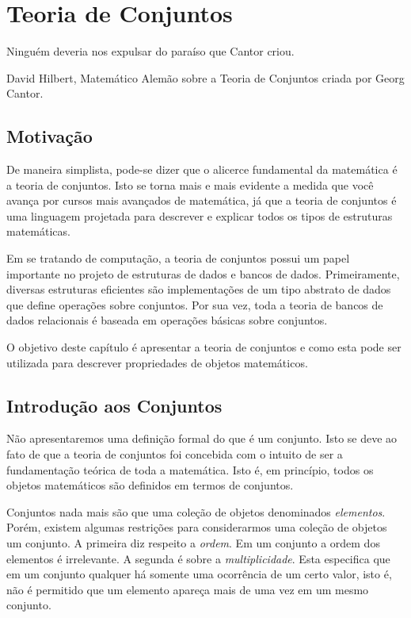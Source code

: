 \chapter{Teoria de Conjuntos}\label{cap5}

\epigraph{Ninguém deveria nos expulsar do paraíso que Cantor criou.}{David Hilbert, Matemático Alemão sobre a Teoria de
  Conjuntos criada por Georg Cantor.}

\section{Motivação}

De maneira simplista, pode-se dizer que o alicerce fundamental da
matemática é a teoria de conjuntos. Isto se torna mais e mais evidente
a medida que você avança por cursos mais avançados de matemática, já
que a teoria de conjuntos é uma linguagem projetada para descrever e
explicar todos os tipos de estruturas matemáticas.

Em se tratando de computação, a teoria de conjuntos possui um papel
importante no projeto de estruturas de dados e bancos de
dados. Primeiramente, diversas estruturas
eficientes são implementações de um tipo abstrato de dados que
define operações sobre conjuntos. Por sua vez, toda a teoria de bancos
de dados relacionais é baseada em operações básicas sobre conjuntos.

O objetivo deste capítulo é apresentar a teoria de conjuntos e como
esta pode ser utilizada para descrever propriedades de objetos
matemáticos.

\section{Introdução aos Conjuntos}

Não apresentaremos uma definição formal do que é um conjunto. Isto se
deve ao fato de que  a teoria de conjuntos foi concebida com o intuito
de ser a fundamentação teórica de toda a matemática. Isto é, em
princípio, todos os objetos matemáticos são definidos em termos de
conjuntos.

Conjuntos nada mais são que uma coleção de objetos denominados
\emph{elementos}. Porém, existem algumas restrições para considerarmos
uma coleção de objetos um conjunto. A primeira diz respeito a
\emph{ordem}. Em um conjunto a ordem dos elementos é irrelevante. A
segunda é sobre a \emph{multiplicidade}. Esta especifica que em um
conjunto qualquer há somente uma ocorrência de um certo valor, isto é,
não é permitido que um elemento apareça mais de uma vez em um mesmo
conjunto.

